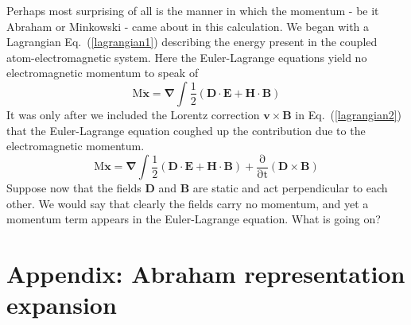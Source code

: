 \documentclass[twocolumn,english,pra,aps,superscriptaddress,floatfix]{revtex4-1}
\begin{document}
Perhaps most surprising of all is the manner in which the momentum - be it Abraham or Minkowski - came about in this calculation.  We began with a Lagrangian  Eq.\ (\ref{lagrangian1})  describing the energy present in the coupled atom-electromagnetic system.  Here the Euler-Lagrange equations yield no electromagnetic momentum to speak of
\begin{equation}
\mathrm{M\ddot{\mathbf{x}}=\mathbf{\nabla}\int\frac{1}{2}\left(\mathbf{D\cdot E}+\mathbf{H\cdot B}\right)}
\end{equation}
It was only after we included the Lorentz correction $\mathbf{v}\times\mathbf{B}$ in Eq.\ (\ref{lagrangian2}) that the Euler-Lagrange equation coughed up the contribution due to the electromagnetic momentum.
\begin{equation}
\mathrm{M\ddot{\mathbf{x}}=\mathbf{\nabla}\int\frac{1}{2}\left(\mathbf{D\cdot E}+\mathbf{H\cdot B}\right)+\frac{\partial}{\partial t}\left(\mathbf{D}\times\mathbf{B}\right)}
\end{equation}
Suppose now that the fields $\mathbf{D}$ and $\mathbf{B}$ are static and act perpendicular to each other.  We would say that clearly the fields carry no momentum, and yet a momentum term appears in the Euler-Lagrange equation.  What is going on?



\section{Appendix: Abraham representation expansion}
\end{document}
